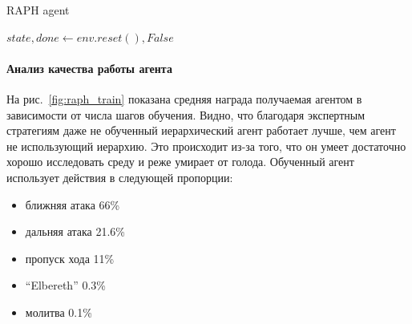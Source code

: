 \begin{algorithm}[H]
\caption{RAPH agent}\label{alg:raph}
$state, done \gets env.reset(), False$\;

\end{algorithm}

\paragraph{Анализ качества работы агента}

На рис.~\ref{fig:raph_train} показана средняя награда получаемая агентом в зависимости от числа шагов обучения. Видно, что благодаря экспертным стратегиям даже не обученный иерархический агент работает лучше, чем агент не использующий иерархию. Это происходит из-за того, что он умеет достаточно хорошо исследовать среду и реже умирает от голода. Обученный агент использует действия в следующей пропорции: 

\begin{itemize}
    \item ближняя атака 66\%
    \item дальняя атака 21.6\%
    \item пропуск хода 11\%
    \item ``Elbereth'' 0.3\%
    \item молитва 0.1\%
\end{itemize}


